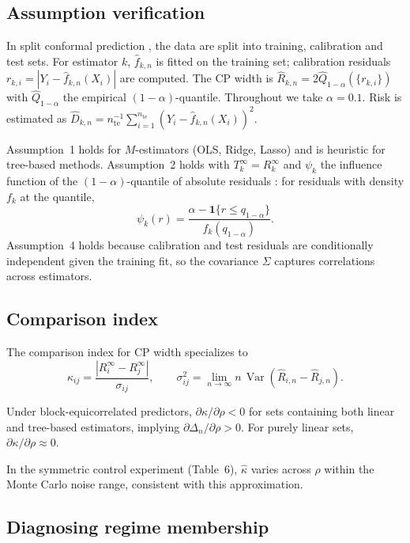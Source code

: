 \documentclass[lineno]{biometrika}
\DeclareMathOperator{\Var}{Var}
\begin{document}
\subsection{Assumption verification}

In split conformal prediction \citep{Lei:2018}, the data are split into training, calibration and test sets. For estimator $k$, $\hat f_{k,n}$ is fitted on the training set; calibration residuals $r_{k,i} = |Y_i - \hat f_{k,n}(X_i)|$ are computed. The CP width is $\hat R_{k,n} = 2\hat Q_{1-\alpha}(\{r_{k,i}\})$ with $\hat Q_{1-\alpha}$ the empirical $(1-\alpha)$-quantile. Throughout we take $\alpha = 0.1$. Risk is estimated as $\hat D_{k,n} = n_{\text{te}}^{-1}\sum_{i=1}^{n_{\text{te}}} (Y_i - \hat f_{k,n}(X_i))^2$.

Assumption~1 holds for $M$-estimators (OLS, Ridge, Lasso) and is heuristic for tree-based methods. Assumption~2 holds with $T_k^\infty = R_k^\infty$ and $\psi_k$ the influence function of the $(1-\alpha)$-quantile of absolute residuals \citep{Bahadur:1966}: for residuals with density $f_k$ at the quantile,
\[
\psi_k(r) = \frac{\alpha - \mathbf{1}\{r \leq q_{1-\alpha}\}}{f_k(q_{1-\alpha})}.
\]
Assumption~4 holds because calibration and test residuals are conditionally independent given the training fit, so the covariance $\Sigma$ captures correlations across estimators.

\subsection{Comparison index}

The comparison index for CP width specializes to
\[
\kappa_{ij} = \frac{|R_i^\infty - R_j^\infty|}{\sigma_{ij}},\qquad
\sigma_{ij}^2 = \lim_{n\to\infty} n \,\Var(\hat R_{i,n} - \hat R_{j,n}).
\]

\begin{corollary}\label{cor:dep}
Under block-equicorrelated predictors, $\partial\kappa/\partial\rho < 0$ for sets containing both linear and tree-based estimators, implying $\partial\Delta_n/\partial\rho > 0$. For purely linear sets, $\partial\kappa/\partial\rho \approx 0$.
\end{corollary}

In the symmetric control experiment (Table~6), $\hat\kappa$ varies across $\rho$ within the Monte Carlo noise range, consistent with this approximation.

\subsection{Diagnosing regime membership}
\end{document}
